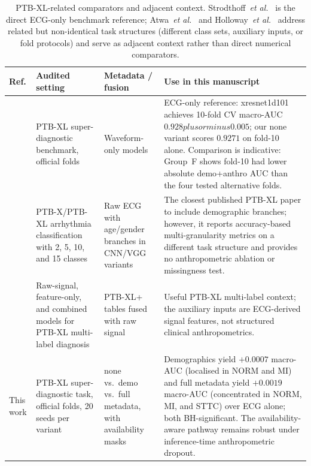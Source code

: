 \documentclass[mathematics,article,pdftex]{Definitions/mdpi}
\def\texttt#1{#1}%
\def\textbf#1{#1}%
\def\pm{plus or minus }%
\begin{document}
\begin{table}[H]
\caption{PTB-XL-related comparators and adjacent context. Strodthoff~\textit{et al.}~\cite{Strodthoff2021} is the direct ECG-only benchmark reference; Atwa~\textit{et al.}~\cite{Atwa2025} and Holloway~\textit{et al.}~\cite{Holloway2026} address related but non-identical task structures (different class sets, auxiliary inputs, or fold protocols) and serve as adjacent context rather than direct numerical comparators.}
\label{tab:prior_a}
\centering
\scriptsize
\setlength{\tabcolsep}{3pt}
\begin{tabularx}{\textwidth}{>{\raggedright\arraybackslash}p{}>{\raggedright\arraybackslash}p{}>{\raggedright\arraybackslash}p{}>{\raggedright\arraybackslash}X}
\toprule
\textbf{Ref.} & \textbf{Audited setting} & \textbf{Metadata / fusion} & \textbf{Use in this manuscript} \\
\midrule
\cite{Strodthoff2021} & PTB-XL super-diagnostic benchmark, official folds & Waveform-only models & ECG-only reference: xresnet1d101 achieves 10-fold CV macro-AUC $0.928 \pm 0.005$; our \texttt{none} variant scores $0.9271$ on fold-10 alone. Comparison is indicative: Group~F shows fold-10 had lower absolute demo+anthro AUC than the four tested alternative folds. \\
\cite{Atwa2025} & PTB-X/PTB-XL arrhythmia classification with 2, 5, 10, and 15 classes & Raw ECG with age/gender branches in CNN/VGG variants & The closest published PTB-XL paper to include demographic branches; however, it reports accuracy-based multi-granularity metrics on a different task structure and provides no anthropometric ablation or missingness test. \\
\cite{Holloway2026} & Raw-signal, feature-only, and combined models for PTB-XL multi-label diagnosis & PTB-XL+ tables fused with raw signal & Useful PTB-XL multi-label context; the auxiliary inputs are ECG-derived signal features, not structured clinical anthropometrics. \\
\midrule
\textbf{This work} & PTB-XL super-diagnostic task, official folds, \textbf{20 seeds} per variant & none vs.\ demo vs.\ full metadata, with availability masks & Demographics yield $+0.0007$ macro-AUC (localised in NORM and MI) and full metadata yield $+0.0019$ macro-AUC (concentrated in NORM, MI, and STTC) over ECG alone; both BH-significant. The availability-aware pathway remains robust under inference-time anthropometric dropout. \\
\bottomrule
\end{tabularx}
\end{table}
\end{document}
